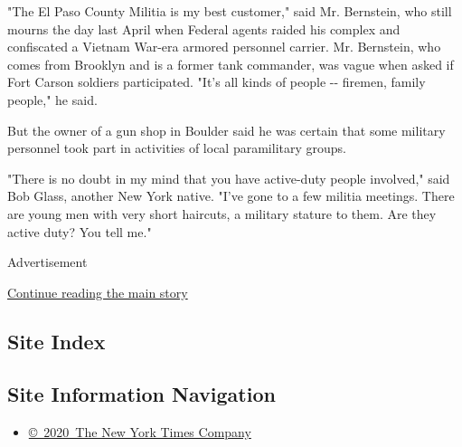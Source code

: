 "The El Paso County Militia is my best customer," said Mr. Bernstein,
who still mourns the day last April when Federal agents raided his
complex and confiscated a Vietnam War-era armored personnel carrier. Mr.
Bernstein, who comes from Brooklyn and is a former tank commander, was
vague when asked if Fort Carson soldiers participated. "It's all kinds
of people -\/- firemen, family people," he said.

But the owner of a gun shop in Boulder said he was certain that some
military personnel took part in activities of local paramilitary groups.

"There is no doubt in my mind that you have active-duty people
involved," said Bob Glass, another New York native. "I've gone to a few
militia meetings. There are young men with very short haircuts, a
military stature to them. Are they active duty? You tell me."

Advertisement

\protect\hyperlink{after-bottom}{Continue reading the main story}

\hypertarget{site-index}{%
\subsection{Site Index}\label{site-index}}

\hypertarget{site-information-navigation}{%
\subsection{Site Information
Navigation}\label{site-information-navigation}}

\begin{itemize}
\tightlist
\item
  \href{https://help.nytimes3xbfgragh.onion/hc/en-us/articles/115014792127-Copyright-notice}{©~2020~The
  New York Times Company}
\end{itemize}

